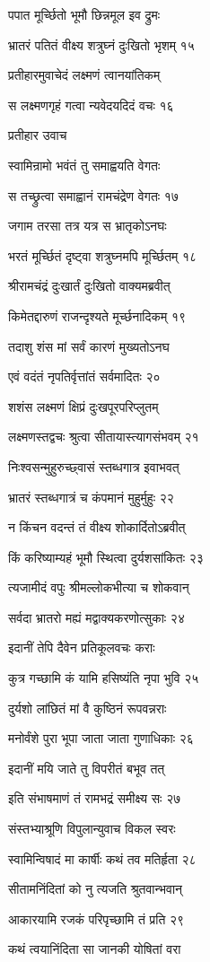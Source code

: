 पपात मूर्च्छितो भूमौ छिन्नमूल इव द्रुमः

भ्रातरं पतितं वीक्ष्य शत्रुघ्नं दुःखितो भृशम् १५

प्रतीहारमुवाचेदं लक्ष्मणं त्वानयांतिकम्

स लक्ष्मणगृहं गत्वा न्यवेदयदिदं वचः १६

प्रतीहार उवाच

स्वामिन्रामो भवंतं तु समाह्वयति वेगतः

स तच्छ्रुत्वा समाह्वानं रामचंद्रेण वेगतः १७

जगाम तरसा तत्र यत्र स भ्रातृकोऽनघः

भरतं मूर्च्छितं दृष्ट्वा शत्रुघ्नमपि मूर्च्छितम् १८

श्रीरामचंद्रं दुःखार्तं दुःखितो वाक्यमब्रवीत्

किमेतद्दारुणं राजन्दृश्यते मूर्च्छनादिकम् १९

तदाशु शंस मां सर्वं कारणं मुख्यतोऽनघ

एवं वदंतं नृपतिर्वृत्तांतं सर्वमादितः २०

शशंस लक्ष्मणं क्षिप्रं दुःखपूरपरिप्लुतम्

लक्ष्मणस्तद्वचः श्रुत्वा सीतायास्त्यागसंभवम् २१

निःश्वसन्मुहुरुच्छ्वासं स्तब्धगात्र इवाभवत्

भ्रातरं स्तब्धगात्रं च कंपमानं मुहुर्मुहुः २२

न किंचन वदन्तं तं वीक्ष्य शोकार्दितोऽब्रवीत्

किं करिष्याम्यहं भूमौ स्थित्वा दुर्यशसांकितः २३

त्यजामीदं वपुः श्रीमल्लोकभीत्या च शोकवान्

सर्वदा भ्रातरो मह्यं मद्वाक्यकरणोत्सुकाः २४

इदानीं तेपि दैवेन प्रतिकूलवचः कराः

कुत्र गच्छामि कं यामि हसिष्यंति नृपा भुवि २५

दुर्यशो लांछितं मां वै कुष्ठिनं रूपवन्नराः

मनोर्वंशे पुरा भूपा जाता जाता गुणाधिकाः २६

इदानीं मयि जाते तु विपरीतं बभूव तत्

इति संभाषमाणं तं रामभद्रं समीक्ष्य सः २७

संस्तभ्याश्रूणि विपुलान्युवाच विकल स्वरः

स्वामिन्विषादं मा कार्षीः कथं तव मतिर्हृता २८

सीतामनिंदितां को नु त्यजति श्रुतवान्भवान्

आकारयामि रजकं परिपृच्छामि तं प्रति २९

कथं त्वयानिंदिता सा जानकी योषितां वरा


